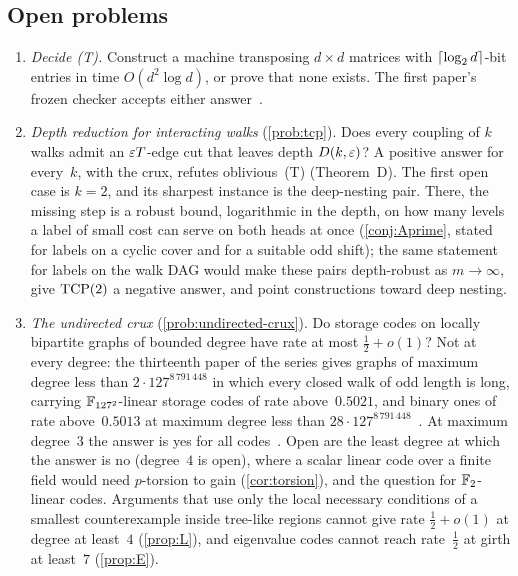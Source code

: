 \subsection{Open problems}

\begin{enumerate}[label=\arabic*.,leftmargin=2em]
\item \emph{Decide (T).} Construct a machine transposing $d\times d$ matrices with $\lceil \log_2 d \rceil$-bit entries in time
$O(d^2\log d)$, or prove that none exists. The first paper's frozen checker accepts either answer~\cite{FirstPaper2026}.

\item \emph{Depth reduction for interacting walks} (\cref{prob:tcp}). Does every coupling of $k$ walks admit an
$\varepsilon T$-edge cut that leaves depth $D(k,\varepsilon)$? A positive answer for every~$k$, with the crux, refutes oblivious~(T)
(Theorem~D). The first open case is $k=2$, and its sharpest instance is the deep-nesting pair. There, the missing step is
a robust bound, logarithmic in the depth, on how many levels a label of small cost can serve on both heads at once
(\cref{conj:Aprime}, stated for labels on a cyclic cover and for a suitable odd shift); the same statement for labels on the walk DAG would
make these pairs depth-robust as $m\to\infty$, give
$\mathrm{TCP}(2)$ a negative answer, and point constructions toward deep nesting.

\item \emph{The undirected crux} (\cref{prob:undirected-crux}). Do storage codes on locally bipartite graphs of bounded
degree have rate at most $\tfrac12+o(1)$? Not at every degree: the thirteenth paper of the series gives graphs of maximum
degree less than $2\cdot127^{8\,791\,448}$ in which every closed walk of odd length is long, carrying
$\mathbb{F}_{127^2}$-linear storage codes of rate above~$0.5021$, and binary ones of rate above~$0.5013$ at maximum degree less
than $28\cdot127^{8\,791\,448}$~\cite[Corollary~U]{StorageCodes2026}. At maximum degree~$3$ the answer is yes for all
codes~\cite[Theorem~N3]{NestedElimination2026}. Open are the least degree at which the answer is no (degree~$4$ is
open), where a scalar linear code over a finite field would need $p$-torsion to gain (\cref{cor:torsion}), and the
question for $\mathbb{F}_2$-linear codes. Arguments that use only the
local necessary conditions of a smallest counterexample inside tree-like regions cannot give rate $\tfrac12+o(1)$ at
degree at least~$4$ (\cref{prop:L}), and eigenvalue codes cannot reach rate~$\tfrac12$ at girth at least~$7$
(\cref{prop:E}).


\end{enumerate}
